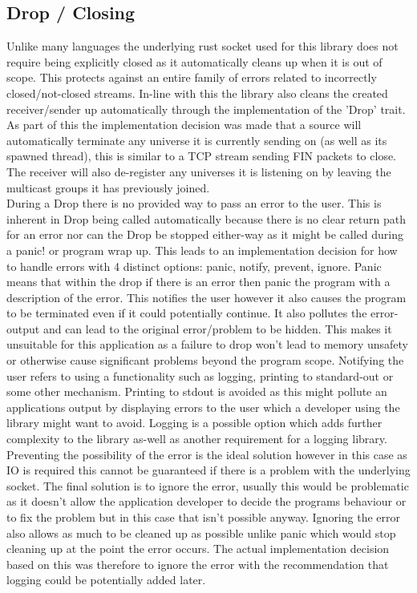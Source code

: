 \documentclass[11pt,a4paper]{article}
\begin{document}
\subsection{Drop / Closing}
Unlike many languages the underlying rust socket used for this library does not require being explicitly closed as it automatically cleans up when it is out of scope. This protects against an entire family of errors related to incorrectly closed/not-closed streams. In-line with this the library also cleans the created receiver/sender up automatically through the implementation of the 'Drop' trait. As part of this the implementation decision was made that a source will automatically terminate any universe it is currently sending on (as well as its spawned thread), this is similar to a TCP stream sending FIN packets to close. The receiver will also de-register any universes it is listening on by leaving the multicast groups it has previously joined. \\

During a Drop there is no provided way to pass an error to the user. This is inherent in Drop being called automatically because there is no clear return path for an error nor can the Drop be stopped either-way as it might be called during a panic! or program wrap up. This leads to an implementation decision for how to handle errors with 4 distinct options: panic, notify, prevent, ignore. Panic means that within the drop if there is an error then panic the program with a description of the error. This notifies the user however it also causes the program to be terminated even if it could potentially continue. It also pollutes the error-output and can lead to the original error/problem to be hidden. This makes it unsuitable for this application as a failure to drop won't lead to memory unsafety or otherwise cause significant problems beyond the program scope. Notifying the user refers to using a functionality such as logging, printing to standard-out or some other mechanism. Printing to stdout is avoided as this might pollute an applications output by displaying errors to the user which a developer using the library might want to avoid. Logging is a possible option which adds further complexity to the library as-well as another requirement for a logging library. Preventing the possibility of the error is the ideal solution however in this case as IO is required this cannot be guaranteed if there is a problem with the underlying socket. The final solution is to ignore the error, usually this would be problematic as it doesn't allow the application developer to decide the programs behaviour or to fix the problem but in this case that isn't possible anyway. Ignoring the error also allows as much to be cleaned up as possible unlike panic which would stop cleaning up at the point the error occurs. The actual implementation decision based on this was therefore to ignore the error with the recommendation that logging could be potentially added later.
\end{document}
